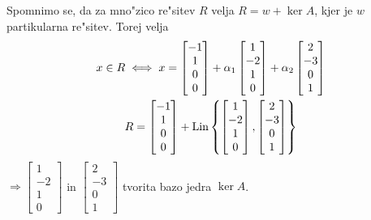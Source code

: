 Spomnimo se, da za mno"zico re"sitev $R$ velja $R = w + \ker A$, kjer je $w$ partikularna re"sitev. Torej velja
\begin{gather*}
x \in R \iff x = \begin{bmatrix}-1 \\ 1 \\ 0 \\ 0\end{bmatrix}
+ \alpha_1 \begin{bmatrix}1 \\ -2 \\ 1 \\ 0\end{bmatrix}
+ \alpha_2 \begin{bmatrix}2 \\ -3 \\ 0 \\ 1\end{bmatrix}
\\
R = \begin{bmatrix}-1 \\ 1 \\ 0 \\ 0\end{bmatrix}
+ \text{Lin} \left\{
\begin{bmatrix}1 \\ -2 \\ 1 \\ 0\end{bmatrix},
\begin{bmatrix}2 \\ -3 \\ 0 \\ 1\end{bmatrix}
 \right\}
\end{gather*}
$\Rightarrow \begin{bmatrix}1 \\ -2 \\ 1 \\ 0\end{bmatrix}$ in $\begin{bmatrix}2 \\ -3 \\ 0 \\ 1\end{bmatrix}$ tvorita bazo jedra $\ker A$.
%
